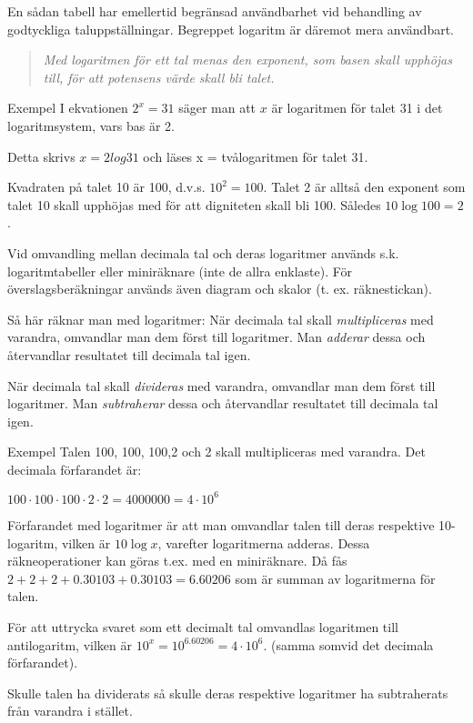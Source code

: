 En sådan tabell har emellertid begränsad
användbarhet vid behandling av godtyckliga
taluppställningar. Begreppet logaritm är däremot mera användbart.

\begin{quote}\emph{
Med logaritmen för ett tal menas den exponent, som basen skall upphöjas till,
för att potensens värde skall bli talet.
}\end{quote}

Exempel
I ekvationen \(2^x = 31\) säger man att \(x\) är logaritmen för talet 31 i det
logaritmsystem, vars bas är 2.

Detta skrivs \(x= 2log 31\) och läses x = tvålogaritmen för talet 31.

Kvadraten på talet 10 är 100, d.v.s. \(10^2 = 100\). Talet 2 är alltså den
exponent som talet 10 skall upphöjas med för att digniteten skall bli 100.
Således \(10\log 100 = 2\).

Vid omvandling mellan decimala tal och deras logaritmer används s.k.
logaritmtabeller eller miniräknare (inte de allra enklaste). För
överslagsberäkningar används även diagram och skalor (t. ex. räknestickan).

Så här räknar man med logaritmer:
När decimala tal skall \emph{multipliceras} med varandra, omvandlar man dem
först till logaritmer. Man \emph{adderar} dessa och återvandlar resultatet till
decimala tal igen.

När decimala tal skall \emph{divideras} med varandra, omvandlar man dem först
till logaritmer. Man \emph{subtraherar} dessa och återvandlar resultatet till
decimala tal igen.

Exempel
Talen 100, 100, 100,2 och 2 skall multipliceras med varandra.
Det decimala förfarandet är:

\(100 \cdot 100 \cdot 100 \cdot 2 \cdot 2 = 4000000 = 4 \cdot 10^6\)

Förfarandet med logaritmer är att man omvandlar talen till deras respektive
10-logaritm, vilken är \(10\log x\), varefter logaritmerna adderas. Dessa
räkneoperationer kan göras t.ex. med en miniräknare. Då fås
\(2 + 2 + 2 + 0.30103 + 0.30103 = 6.60206\) som är summan av logaritmerna för
talen.

För att uttrycka svaret som ett decimalt tal omvandlas logaritmen till
antilogaritm, vilken är \(10^x = 10^{6.60206} = 4 \cdot 10^6\).
(samma somvid det decimala förfarandet).

Skulle talen ha dividerats så skulle deras respektive logaritmer ha subtraherats
från varandra i stället.

